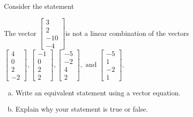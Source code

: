 
\begin{exerciseStatement}


Consider the statement 
\begin{center}\begin{minipage}{0.8\textwidth}
 The vector \( \left[\begin{array}{c}
3 \\
2 \\
-10 \\
-4
\end{array}\right] \)is not a linear combination of the vectors \( \left[\begin{array}{c}
4 \\
0 \\
2 \\
-2
\end{array}\right] , \left[\begin{array}{c}
-1 \\
0 \\
2 \\
2
\end{array}\right] , \left[\begin{array}{c}
-5 \\
-2 \\
4 \\
2
\end{array}\right] , \text{ and } \left[\begin{array}{c}
-5 \\
1 \\
-2 \\
1
\end{array}\right] \). 
\end{minipage}\end{center}
    


\begin{enumerate}[(a)]
\item  Write an equivalent statement using a vector equation.
\item  Explain why your statement is true or false.
\end{enumerate}
    
\end{exerciseStatement}
    
